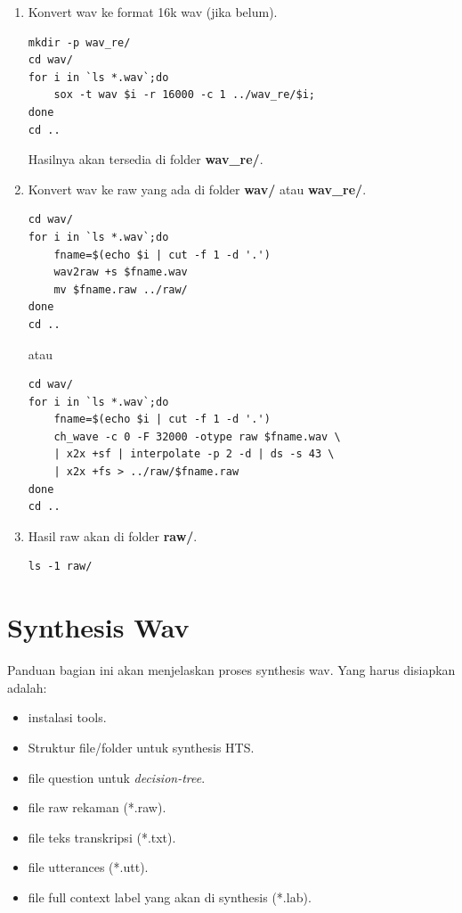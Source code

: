 \documentclass[12pt,]{article}
\begin{document}
\begin{enumerate}
		\item Konvert wav ke format 16k wav (jika belum).
		\begin{verbatim}
mkdir -p wav_re/
cd wav/
for i in `ls *.wav`;do
	sox -t wav $i -r 16000 -c 1 ../wav_re/$i;
done
cd ..
		\end{verbatim}

		Hasilnya akan tersedia di folder \textbf{wav\_re/}.

		\item Konvert wav ke raw yang ada di folder \textbf{wav/} atau \textbf{wav\_re/}.

		\begin{verbatim}
cd wav/
for i in `ls *.wav`;do
	fname=$(echo $i | cut -f 1 -d '.')
	wav2raw +s $fname.wav
	mv $fname.raw ../raw/
done
cd ..
		\end{verbatim}

		\newpage
		atau
		\begin{verbatim}
cd wav/
for i in `ls *.wav`;do
	fname=$(echo $i | cut -f 1 -d '.')
	ch_wave -c 0 -F 32000 -otype raw $fname.wav \
	| x2x +sf | interpolate -p 2 -d | ds -s 43 \
	| x2x +fs > ../raw/$fname.raw
done
cd ..
		\end{verbatim}

		\item Hasil raw akan di folder \textbf{raw/}.
		\begin{verbatim}
ls -1 raw/
		\end{verbatim}

	\end{enumerate}

	\newpage
	\mbox{}

	\newpage
	\section{Synthesis Wav}

	Panduan bagian ini akan menjelaskan proses synthesis wav.
	Yang harus disiapkan adalah:
	\begin{itemize}
		\item instalasi tools.

		\item Struktur file/folder untuk synthesis HTS.

		\item file question untuk \textit{decision-tree}.

		\item file raw rekaman (*.raw).

		\item file teks transkripsi (*.txt).

		\item file utterances (*.utt).

		\item file full context label yang akan di synthesis (*.lab).
	\end{itemize}
\end{document}
